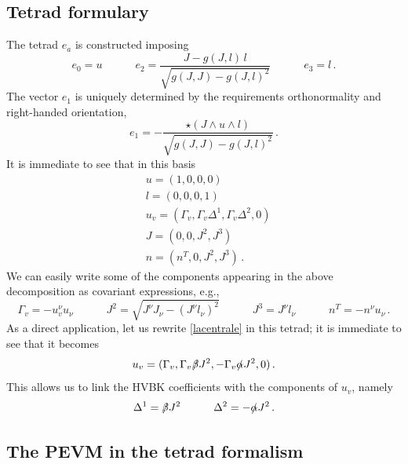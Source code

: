 \documentclass[preprints,article,accept,moreauthors,pdftex]{mdpi}
\newcommand{\spc}{\quad \quad \quad}
\begin{document}
\subsection{Tetrad formulary}\label{tettru}

The tetrad $e_a$ is constructed imposing
\begin{equation}
e_0 = u  \spc e_2 = \dfrac{J -g(J,l) \, l}{\sqrt{g(J,J)-g(J,l)^2}}  \spc e_3 =l \, .
\end{equation}
The vector $e_1$ is uniquely determined by the requirements orthonormality and right-handed orientation,
\begin{equation}
e_1 = - \dfrac{\star (J \wedge u \wedge l)}{\sqrt{g(J,J)-g(J,l)^2}} \, .
\end{equation}
It is immediate to see that in this basis
\begin{equation}
\begin{split}
& u= (1,0,0,0) \\
& l= (0,0,0,1)  \\
& u_v= (\Gamma_v, \Gamma_v \Delta^1,\Gamma_v \Delta^2,0)\\
& J= (0,0,J^2,J^3) \\
& n= (n^T,0,J^2,J^3) \, . 
\end{split}
\end{equation}
We can easily write some of the components appearing in the above decomposition as covariant expressions, e.g.,
\begin{equation}
 \Gamma_v = -u_v^\nu u_\nu \spc
 J^2 =\sqrt{ J^\nu J_\nu - (J^\nu l_\nu)^2} \spc
 J^3 = J^\nu l_\nu \spc
 n^T = -n^\nu u_\nu \, . 
\end{equation}  
As a direct application, let us rewrite \eqref{lacentrale} in this tetrad; it is immediate to see that it becomes
\begin{equation}
u_v = ( \Gamma_v , \Gamma_v \slashed{\beta} J^2, -\Gamma_v \slashed{\alpha}J^2,0  ) \, .
\end{equation} 
This allows us to link the HVBK coefficients with the components of $u_v$, namely 
\begin{equation}\label{Chepassione}
\Delta^1 =  \slashed{\beta} J^2  \spc \Delta^2 = -\slashed{\alpha}J^2 \, . 
\end{equation} 

\subsection{The PEVM in the tetrad formalism}\label{tetraddizzareIldrag}
\end{document}
